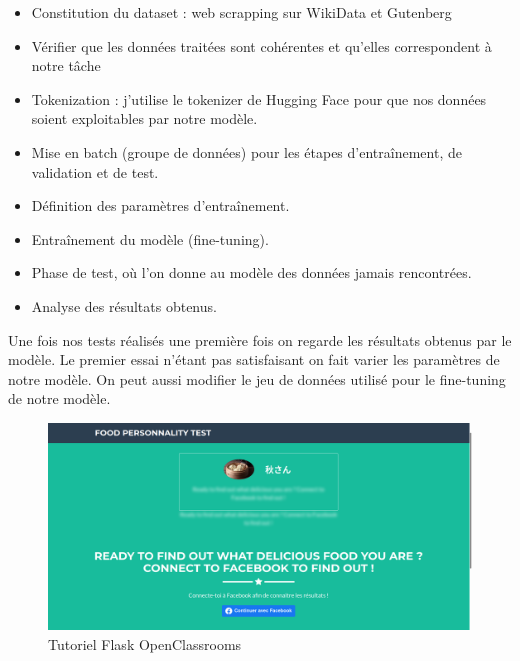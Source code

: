 \documentclass[12pt]{article}
\begin{document}
\begin{itemize}
    \item Constitution du dataset : web scrapping sur WikiData et Gutenberg
    
    \item Vérifier que les données traitées sont cohérentes et qu'elles correspondent à notre tâche
    
    \item Tokenization : j'utilise le tokenizer de Hugging Face pour que nos données soient exploitables par notre modèle. 
    
    \item Mise en batch (groupe de données) pour les étapes d'entraînement, de validation et de test.
    
    \item Définition des paramètres d'entraînement. 
    
    \item Entraînement du modèle (fine-tuning).
    
    \item Phase de test, où l'on donne au modèle des données jamais rencontrées.
    
    \item Analyse des résultats obtenus. 
    
\end{itemize}

Une fois nos tests réalisés une première fois on regarde les résultats obtenus par le modèle. Le premier essai n'étant pas satisfaisant on fait varier les paramètres de notre modèle. On peut aussi modifier le jeu de données utilisé pour le fine-tuning de notre modèle. 

\newpage



\begin{figure}
    \centering
    \includegraphics[scale=0.27]{tuto_OC.png}
    \caption{Tutoriel Flask OpenClassrooms}
    \label{fig:tuto_OC}
\end{figure}
\end{document}
